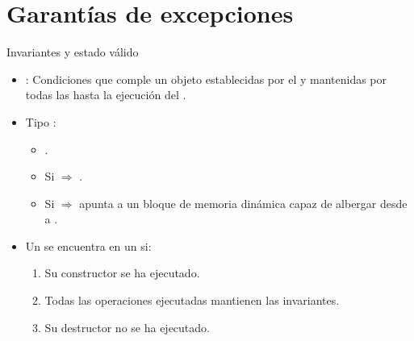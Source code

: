 \section{Garantías de excepciones}

\begin{frame}[t]{Invariantes y estado válido}
\begin{itemize}
  \item {}: Condiciones que comple un objeto
        establecidas por el  y mantenidas por todas las
         hasta la ejecución del .

  \item Tipo :
    \begin{itemize}
      \item {}.
      \item Si  $\Rightarrow$ .
      \item Si  $\Rightarrow$  apunta
            a un bloque de memoria dinámica capaz de albergar desde 
            a .
    \end{itemize}

  \item Un  se encuentra en un  si:
    \begin{enumerate}
      \item Su constructor se ha ejecutado.
      \item Todas las operaciones ejecutadas mantienen las invariantes.
      \item Su destructor no se ha ejecutado.
    \end{enumerate}
\end{itemize}
\end{frame}

